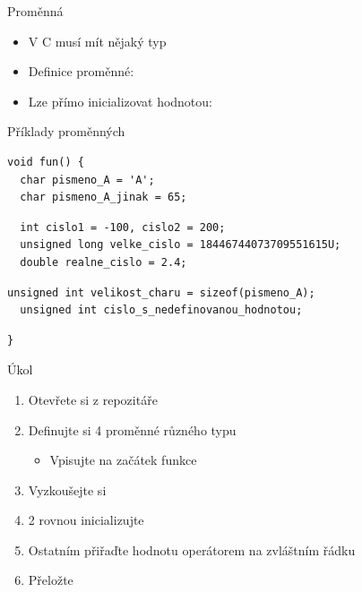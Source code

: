 \begin{frame}[fragile]{Proměnná}

  \begin{itemize}
    \item V C musí mít nějaký typ

    \pause

    \item Definice proměnné: 

    \pause

    \item Lze přímo inicializovat hodnotou: 
  \end{itemize}

  \pause

  \begin{block}{Příklady proměnných}
    \begin{lstlisting}
void fun() {
  char pismeno_A = 'A';
  char pismeno_A_jinak = 65;
    \end{lstlisting}
    \pause
    \begin{lstlisting}
  int cislo1 = -100, cislo2 = 200;
  unsigned long velke_cislo = 18446744073709551615U;
  double realne_cislo = 2.4;
    \end{lstlisting}
    \pause
    \begin{lstlisting}[belowskip=0pt]
  unsigned int velikost_charu = sizeof(pismeno_A);
  unsigned int cislo_s_nedefinovanou_hodnotou;
    \end{lstlisting}
    \pause
    \begin{lstlisting}[aboveskip=0pt]
}
  \end{lstlisting}
  \end{block}

\end{frame}

\begin{frame}{Úkol}

  \begin{enumerate}
    \item Otevřete si  z repozitáře

    \item Definujte si 4 proměnné různého typu
    \begin{itemize}
      \item Vpisujte na začátek funkce 
    \end{itemize}

    \item Vyzkoušejte si 
    \item 2 rovnou inicializujte
    \item Ostatním přiřaďte hodnotu operátorem \code{=} na zvláštním řádku
    \item Přeložte
  \end{enumerate}

\end{frame}

